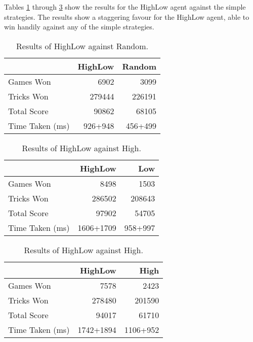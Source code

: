 Tables \ref{tab:highlow_random} through \ref{tab:highlow_high} show the results for the HighLow agent against the simple
strategies. The results show a staggering favour for the HighLow agent, able to win handily against any of the simple strategies.

\begin{table}[ht]
    \centering
    \begin{tabular}{l|rr}
        ~               &   HighLow &   Random  \\  \hline
        Games Won       &   6902   &   3099   \\
        Tricks Won      &   279444 &   226191 \\
        Total Score     &   90862  &   68105  \\
        Time Taken (ms) &   926+948   &   456+499
    \end{tabular}
    \caption{Results of HighLow against Random.}
    \label{tab:highlow_random}
\end{table}

\begin{table}[ht]
    \begin{minipage}{.5\linewidth}
        \centering
        \begin{tabular}{l|rr}
            ~               &   HighLow &   Low     \\  \hline
            Games Won       &   8498   &   1503   \\
            Tricks Won      &   286502 &   208643 \\
            Total Score     &   97902  &   54705  \\
            Time Taken (ms) &   1606+1709   &   958+997
        \end{tabular}
        \caption{Results of HighLow against Low.}
        \label{tab:highlow_low}
    \end{minipage}%
    \begin{minipage}{.5\linewidth}
        \centering
        \begin{tabular}{l|rr}
            ~               &   HighLow &   High    \\  \hline
            Games Won       &   7578   &   2423   \\
            Tricks Won      &   278480 &   201590 \\
            Total Score     &   94017  &   61710  \\
            Time Taken (ms) &   1742+1894   &   1106+952
        \end{tabular}
        \caption{Results of HighLow against High.}
        \label{tab:highlow_high}
    \end{minipage} 
\end{table}



